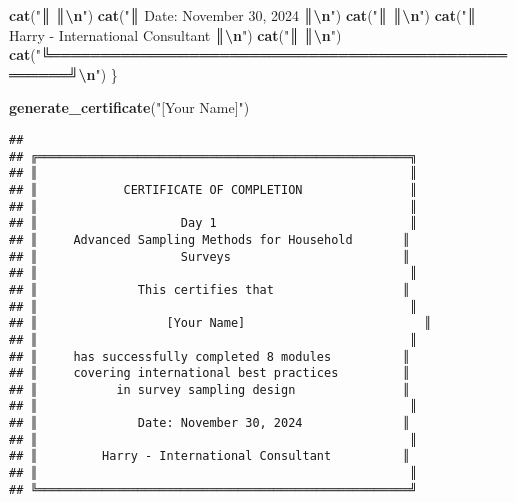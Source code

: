\documentclass[
]{article}
\newenvironment{Shaded}{\begin{snugshade}}{\end{snugshade}}
\newcommand{\FunctionTok}[1]{\textcolor[rgb]{0.13,0.29,0.53}{\textbf{#1}}}
\newcommand{\NormalTok}[1]{#1}
\newcommand{\SpecialCharTok}[1]{\textcolor[rgb]{0.81,0.36,0.00}{\textbf{#1}}}
\newcommand{\StringTok}[1]{\textcolor[rgb]{0.31,0.60,0.02}{#1}}
\begin{document}
\begin{Shaded}
\begin{Highlighting}[]
  \FunctionTok{cat}\NormalTok{(}\StringTok{"║                                                    ║}\SpecialCharTok{\textbackslash{}n}\StringTok{"}\NormalTok{)}
  \FunctionTok{cat}\NormalTok{(}\StringTok{"║              Date: November 30, 2024              ║}\SpecialCharTok{\textbackslash{}n}\StringTok{"}\NormalTok{)}
  \FunctionTok{cat}\NormalTok{(}\StringTok{"║                                                    ║}\SpecialCharTok{\textbackslash{}n}\StringTok{"}\NormalTok{)}
  \FunctionTok{cat}\NormalTok{(}\StringTok{"║         Harry {-} International Consultant          ║}\SpecialCharTok{\textbackslash{}n}\StringTok{"}\NormalTok{)}
  \FunctionTok{cat}\NormalTok{(}\StringTok{"║                                                    ║}\SpecialCharTok{\textbackslash{}n}\StringTok{"}\NormalTok{)}
  \FunctionTok{cat}\NormalTok{(}\StringTok{"╚════════════════════════════════════════════════════╝}\SpecialCharTok{\textbackslash{}n}\StringTok{"}\NormalTok{)}
\NormalTok{\}}

\FunctionTok{generate\_certificate}\NormalTok{(}\StringTok{"[Your Name]"}\NormalTok{)}
\end{Highlighting}
\end{Shaded}

\begin{verbatim}
## 
## ╔════════════════════════════════════════════════════╗
## ║                                                    ║
## ║            CERTIFICATE OF COMPLETION               ║
## ║                                                    ║
## ║                    Day 1                           ║
## ║     Advanced Sampling Methods for Household       ║
## ║                    Surveys                        ║
## ║                                                    ║
## ║              This certifies that                  ║
## ║                                                    ║
## ║                  [Your Name]                         ║
## ║                                                    ║
## ║     has successfully completed 8 modules          ║
## ║     covering international best practices         ║
## ║           in survey sampling design               ║
## ║                                                    ║
## ║              Date: November 30, 2024              ║
## ║                                                    ║
## ║         Harry - International Consultant          ║
## ║                                                    ║
## ╚════════════════════════════════════════════════════╝
\end{verbatim}
\end{document}
